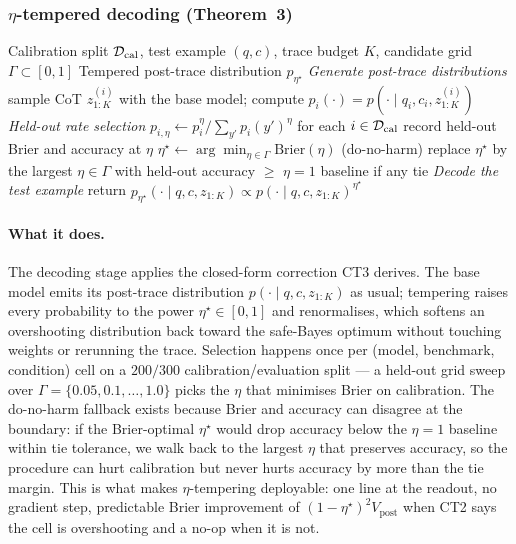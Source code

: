 \subsubsection{$\eta$-tempered decoding (Theorem~3)}

\begin{algorithm}[H]
\small
\caption{$\eta$-tempered post-trace decoding.  $\eta^\star$ selected
per-(model, benchmark, condition) on a held-out split, with do-no-harm
fallback.}
\begin{algorithmic}
\Require Calibration split $\mathcal{D}_{\mathrm{cal}}$, test example $(q,c)$,
trace budget $K$, candidate grid $\Gamma\subset[0,1]$
\Ensure Tempered post-trace distribution $p_{\eta^\star}$
\Statex \textit{Generate post-trace distributions}
  \State sample CoT $z_{1:K}^{(i)}$ with the base model;
  compute $p_i(\cdot)\!=\!p(\cdot\mid q_i,c_i,z_{1:K}^{(i)})$
\EndFor
\Statex \textit{Held-out rate selection}
\ForAll{$\eta\in\Gamma$}
  \State $p_{i,\eta}\gets p_i^\eta/\sum_{y'} p_i(y')^\eta$ for each $i\in\mathcal{D}_{\mathrm{cal}}$
  \State record held-out Brier and accuracy at $\eta$
\EndFor
\State $\eta^\star\gets \arg\min_{\eta\in\Gamma}\mathrm{Brier}(\eta)$
\State (do-no-harm) replace $\eta^\star$ by the largest $\eta\in\Gamma$ with held-out
accuracy $\geq$ $\eta\!=\!1$ baseline if any tie
\Statex \textit{Decode the test example}
\State return $p_{\eta^\star}(\cdot\mid q,c,z_{1:K})\propto p(\cdot\mid q,c,z_{1:K})^{\eta^\star}$
\end{algorithmic}
\end{algorithm}

\paragraph{What it does.} The decoding stage applies the closed-form correction CT3 derives. The base model emits its post-trace distribution $p(\cdot\mid q,c,z_{1:K})$ as usual; tempering raises every probability to the power $\eta^\star\!\in\![0,1]$ and renormalises, which softens an overshooting distribution back toward the safe-Bayes optimum without touching weights or rerunning the trace. Selection happens once per (model, benchmark, condition) cell on a $200/300$ calibration/evaluation split — a held-out grid sweep over $\Gamma\!=\!\{0.05,0.1,\dots,1.0\}$ picks the $\eta$ that minimises Brier on calibration. The do-no-harm fallback exists because Brier and accuracy can disagree at the boundary: if the Brier-optimal $\eta^\star$ would drop accuracy below the $\eta\!=\!1$ baseline within tie tolerance, we walk back to the largest $\eta$ that preserves accuracy, so the procedure can hurt calibration but never hurts accuracy by more than the tie margin. This is what makes $\eta$-tempering deployable: one line at the readout, no gradient step, predictable Brier improvement of $(1\!-\!\eta^\star)^{2}V_{\mathrm{post}}$ when CT2 says the cell is overshooting and a no-op when it is not.

